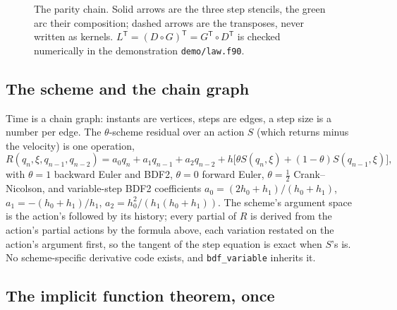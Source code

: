\documentclass[11pt,a4paper]{article}
\newcommand{\tr}{^{\mathsf T}}
\newcommand{\R}{\mathbb R}
\newcommand{\code}[1]{\texttt{#1}}
\begin{document}
\begin{figure}[H]
\centering
{}
\caption{The parity chain. Solid arrows are the three step stencils, the green arc their composition; dashed arrows are the transposes, never written as kernels. $L\tr = (D\circ G)\tr = G\tr\circ D\tr$ is checked numerically in the demonstration \code{demo/law.f90}.}
\label{fig:parity}
\end{figure}

\subsection{The scheme and the chain graph}\label{sec:scheme}

Time is a chain graph: instants are vertices, steps are edges, a step size is a number per edge. The $\theta$-scheme residual over an action $S$ (which returns minus the velocity) is one operation,
\[
R(q_n,\xi,q_{n-1},q_{n-2}) = a_0q_n + a_1q_{n-1} + a_2q_{n-2} + h\big[\theta S(q_n,\xi) + (1-\theta)S(q_{n-1},\xi)\big],
\]
with $\theta=1$ backward Euler and BDF2, $\theta=0$ forward Euler, $\theta=\tfrac12$ Crank--Nicolson, and variable-step BDF2 coefficients $a_0 = (2h_0+h_1)/(h_0+h_1)$, $a_1=-(h_0+h_1)/h_1$, $a_2 = h_0^2/(h_1(h_0+h_1))$. The scheme's argument space is the action's followed by its history; every partial of $R$ is derived from the action's partial actions by the formula above, each variation restated on the action's argument first, so the tangent of the step equation is exact when $S$'s is. No scheme-specific derivative code exists, and \code{bdf\_variable} inherits it.

\subsection{The implicit function theorem, once}\label{sec:ift}
\end{document}
